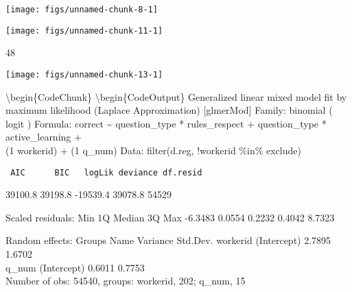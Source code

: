 \documentclass[10pt, letterpaper]{article}
\newenvironment{CodeChunk}{}{}
\begin{document}
\begin{CodeChunk}

\texttt{[image: figs/unnamed-chunk-8-1]} \end{CodeChunk}

\begin{CodeChunk}

\texttt{[image: figs/unnamed-chunk-11-1]} \end{CodeChunk}

\begin{CodeChunk}
\begin{CodeOutput}
[1] 48
\end{CodeOutput}
\end{CodeChunk}

\begin{CodeChunk}

\texttt{[image: figs/unnamed-chunk-13-1]} \end{CodeChunk}

\textbackslash{}begin\{CodeChunk\} \textbackslash{}begin\{CodeOutput\}
Generalized linear mixed model fit by maximum likelihood (Laplace
Approximation) {[}glmerMod{]} Family: binomial ( logit ) Formula:
correct \textasciitilde{} question\_type * rules\_respect +
question\_type * active\_learning +\\ (1 \textbar{} workerid) + (1
\textbar{} q\_num) Data: filter(d.reg, !workerid \%in\% exclude)

\begin{verbatim}
 AIC      BIC   logLik deviance df.resid 
\end{verbatim}

39100.8 39198.8 -19539.4 39078.8 54529

Scaled residuals: Min 1Q Median 3Q Max -6.3483 0.0554 0.2232 0.4042
8.7323

Random effects: Groups Name Variance Std.Dev. workerid (Intercept)
2.7895 1.6702\\ q\_num (Intercept) 0.6011 0.7753\\Number of obs: 54540,
groups: workerid, 202; q\_num, 15
\end{document}
